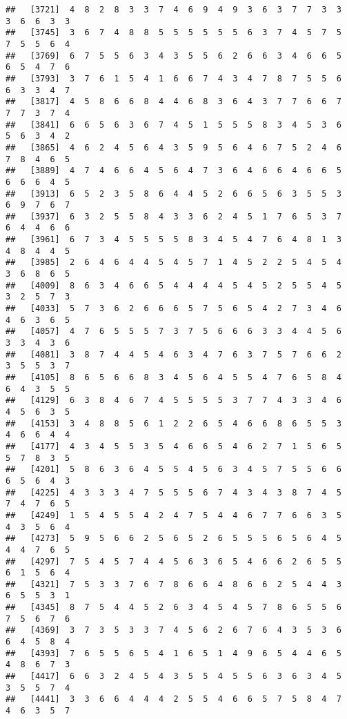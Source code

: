 \documentclass[
]{book}
\begin{document}
\begin{verbatim}
##   [3721]  4  8  2  8  3  3  7  4  6  9  4  9  3  6  3  7  7  3  3  3  6  6  3  3
##   [3745]  3  6  7  4  8  8  5  5  5  5  5  5  6  3  7  4  5  7  5  7  5  5  6  4
##   [3769]  6  7  5  5  6  3  4  3  5  5  6  2  6  6  3  4  6  6  5  6  5  4  7  6
##   [3793]  3  7  6  1  5  4  1  6  6  7  4  3  4  7  8  7  5  5  6  6  3  3  4  7
##   [3817]  4  5  8  6  6  8  4  4  6  8  3  6  4  3  7  7  6  6  7  7  7  3  7  4
##   [3841]  6  6  5  6  3  6  7  4  5  1  5  5  5  8  3  4  5  3  6  5  6  3  4  2
##   [3865]  4  6  2  4  5  6  4  3  5  9  5  6  4  6  7  5  2  4  6  7  8  4  6  5
##   [3889]  4  7  4  6  6  4  5  6  4  7  3  6  4  6  6  4  6  6  5  6  6  6  4  5
##   [3913]  6  5  2  3  5  8  6  4  4  5  2  6  6  5  6  3  5  5  3  6  9  7  6  7
##   [3937]  6  3  2  5  5  8  4  3  3  6  2  4  5  1  7  6  5  3  7  6  4  4  6  6
##   [3961]  6  7  3  4  5  5  5  5  8  3  4  5  4  7  6  4  8  1  3  4  8  4  4  5
##   [3985]  2  6  4  6  4  4  5  4  5  7  1  4  5  2  2  5  4  5  4  3  6  8  6  5
##   [4009]  8  6  3  4  6  6  5  4  4  4  4  5  4  5  2  5  5  4  5  3  2  5  7  3
##   [4033]  5  7  3  6  2  6  6  6  5  7  5  6  5  4  2  7  3  4  6  4  6  3  6  5
##   [4057]  4  7  6  5  5  5  7  3  7  5  6  6  6  3  3  4  4  5  6  3  3  4  3  6
##   [4081]  3  8  7  4  4  5  4  6  3  4  7  6  3  7  5  7  6  6  2  3  5  5  3  7
##   [4105]  8  6  5  6  6  8  3  4  5  6  4  5  5  4  7  6  5  8  4  6  4  3  5  5
##   [4129]  6  3  8  4  6  7  4  5  5  5  5  3  7  7  4  3  3  4  6  4  5  6  3  5
##   [4153]  3  4  8  8  5  6  1  2  2  6  5  4  6  6  8  6  5  5  3  4  6  6  4  4
##   [4177]  4  3  4  5  5  3  5  4  6  6  5  4  6  2  7  1  5  6  5  5  7  8  3  5
##   [4201]  5  8  6  3  6  4  5  5  4  5  6  3  4  5  7  5  5  6  6  6  5  6  4  3
##   [4225]  4  3  3  3  4  7  5  5  5  6  7  4  3  4  3  8  7  4  5  7  4  7  6  5
##   [4249]  1  5  4  5  5  4  2  4  7  5  4  4  6  7  7  6  6  3  5  4  3  5  6  4
##   [4273]  5  9  5  6  6  2  5  6  5  2  6  5  5  5  6  5  6  4  5  4  4  7  6  5
##   [4297]  7  5  4  5  7  4  4  5  6  3  6  5  4  6  6  2  6  5  5  6  1  5  6  4
##   [4321]  7  5  3  3  7  6  7  8  6  6  4  8  6  6  2  5  4  4  3  6  5  5  3  1
##   [4345]  8  7  5  4  4  5  2  6  3  4  5  4  5  7  8  6  5  5  6  7  5  6  7  6
##   [4369]  3  7  3  5  3  3  7  4  5  6  2  6  7  6  4  3  5  3  6  6  4  5  8  4
##   [4393]  7  6  5  5  6  5  4  1  6  5  1  4  9  6  5  4  4  6  5  4  8  6  7  3
##   [4417]  6  6  3  2  4  5  4  3  5  5  4  5  5  6  3  6  3  4  5  3  5  5  7  4
##   [4441]  3  3  6  6  4  4  4  2  5  5  4  6  6  5  7  5  8  4  7  4  6  3  5  7

\end{verbatim}
\end{document}
